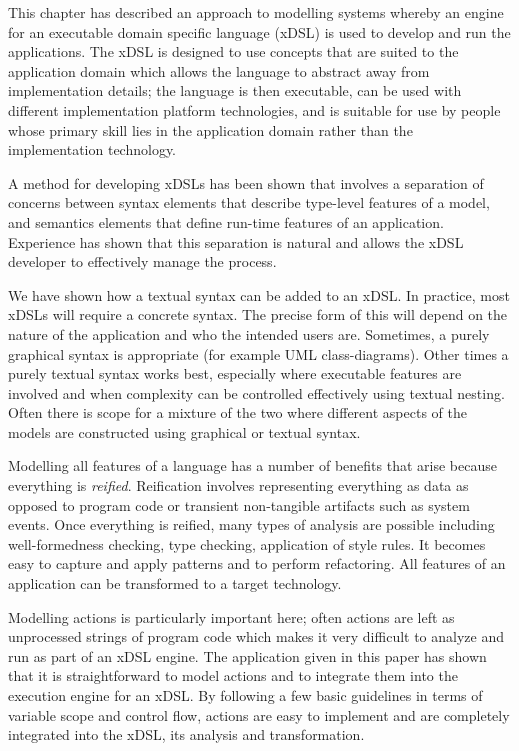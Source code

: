 This chapter has described an approach to modelling systems whereby
an engine for an executable domain specific language (xDSL) is used
to develop and run the applications. The xDSL is designed to use concepts
that are suited to the application domain which allows the language
to abstract away from implementation details; the language is then
executable, can be used with different implementation platform technologies,
and is suitable for use by people whose primary skill lies in the
application domain rather than the implementation technology.

A method for developing xDSLs has been shown that involves a separation
of concerns between syntax elements that describe type-level features
of a model, and semantics elements that define run-time features of
an application. Experience has shown that this separation is natural
and allows the xDSL developer to effectively manage the process.

We have shown how a textual syntax can be added to an xDSL. In practice,
most xDSLs will require a concrete syntax. The precise form of this
will depend on the nature of the application and who the intended
users are. Sometimes, a purely graphical syntax is appropriate (for
example UML class-diagrams). Other times a purely textual syntax works
best, especially where executable features are involved and when complexity
can be controlled effectively using textual nesting. Often there is
scope for a mixture of the two where different aspects of the models
are constructed using graphical or textual syntax.

Modelling all features of a language has a number of benefits that
arise because everything is \emph{reified}. Reification involves representing
everything as data as opposed to program code or transient non-tangible
artifacts such as system events. Once everything is reified, many
types of analysis are possible including well-formedness checking,
type checking, application of style rules. It becomes easy to capture
and apply patterns and to perform refactoring. All features of an
application can be transformed to a target technology. 

Modelling actions is particularly important here; often actions are
left as unprocessed strings of program code which makes it very difficult
to analyze and run as part of an xDSL engine. The application given
in this paper has shown that it is straightforward to model actions
and to integrate them into the execution engine for an xDSL. By following
a few basic guidelines in terms of variable scope and control flow,
actions are easy to implement and are completely integrated into the
xDSL, its analysis and transformation.
